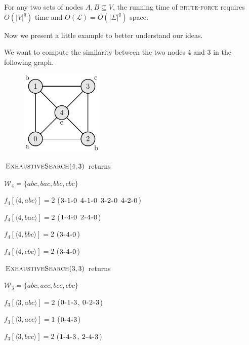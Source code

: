 \begin{lemma}
	For any two sets of nodes $A, B \subseteq V$, the running time of \textsc{brute-force} requires $O(|V|^{q})$ time and $O(\mathcal{L}) = O(|\Sigma|^{q})$ space.
\end{lemma}

Now we present a little example to better understand our ideas.
	
\begin{esempio}
	We want to compute the similarity between the two nodes $4$ and $3$ in the following graph.	
\end{esempio}

\begin{figure}
	\includegraphics[width=0.35\textwidth]{figure/figure-3-2}
\end{figure}
	
$\textsc{ExhaustiveSearch}(4, 3)$ returns \medskip

$\mathcal{W}_{4} = \{ abc, bac, bbc, cbc \}$ \medskip
		
$f_{4}[\langle 4, abc \rangle] = 2$ ($\textsc{3-1-0}$ $\textsc{4-1-0}$ $\textsc{3-2-0}$ $\textsc{4-2-0}$)\medskip
		
$f_{4}[\langle 4, bac \rangle] = 2$ ($\textsc{1-4-0}$ $\textsc{2-4-0}$)\medskip
		
$f_{4}[\langle 4, bbc \rangle] = 2$ ($\textsc{3-4-0}$)\medskip
		
$f_{4}[\langle 4, cbc \rangle] = 2$ ($\textsc{3-4-0}$)\bigskip
		
$\textsc{ExhaustiveSearch}(3, 3)$ returns\medskip
		
$\mathcal{W}_{3} = \{ abc, acc, bcc, cbc \}$\medskip
		
$f_{3}[\langle 3, abc \rangle] = 2$ ($\textsc{0-1-3}$, $\textsc{0-2-3}$)\medskip
		
$f_{3}[\langle 3, acc \rangle] = 1$ ($\textsc{0-4-3}$)\medskip
		
$f_{3}[\langle 3, bcc \rangle] = 2$ ($\textsc{1-4-3}$, $\textsc{2-4-3}$)\medskip
		
